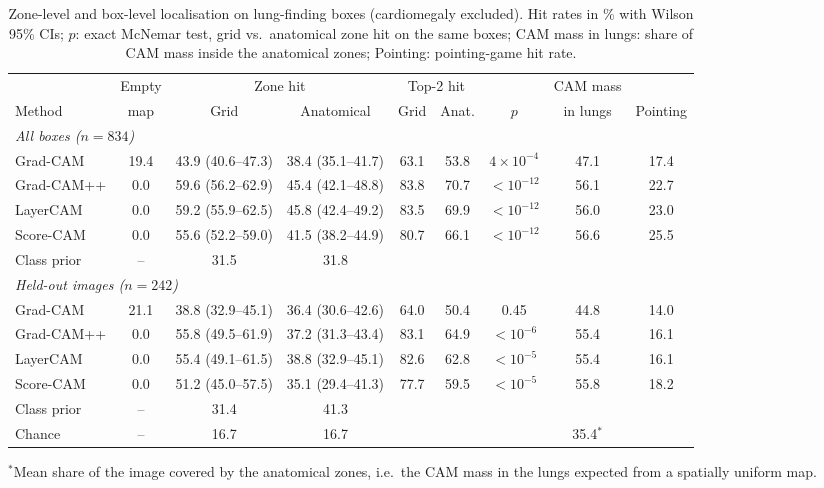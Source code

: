 \documentclass[pdflatex,sn-mathphys-num]{sn-jnl}
\begin{document}
\begin{table}[t]
\caption{Zone-level and box-level localisation on lung-finding boxes (cardiomegaly excluded). Hit rates in \% with Wilson 95\% CIs; $p$: exact McNemar test, grid vs.\ anatomical zone hit on the same boxes; CAM mass in lungs: share of CAM mass inside the anatomical zones; Pointing: pointing-game hit rate.}\label{tab:zone}
\centering
\small
\setlength{\tabcolsep}{3pt}
\begin{tabular}{lcccccccc}
\toprule
 & Empty & \multicolumn{2}{c}{Zone hit} & \multicolumn{2}{c}{Top-2 hit} & & CAM mass & \\
Method & map & Grid & Anatomical & Grid & Anat. & $p$ & in lungs & Pointing \\
\midrule
\multicolumn{9}{l}{\emph{All boxes ($n=834$)}}\\
Grad-CAM   & 19.4 & 43.9 (40.6--47.3) & 38.4 (35.1--41.7) & 63.1 & 53.8 & $4\times10^{-4}$ & 47.1 & 17.4 \\
Grad-CAM++ & 0.0 & 59.6 (56.2--62.9) & 45.4 (42.1--48.8) & 83.8 & 70.7 & $<10^{-12}$ & 56.1 & 22.7 \\
LayerCAM   & 0.0 & 59.2 (55.9--62.5) & 45.8 (42.4--49.2) & 83.5 & 69.9 & $<10^{-12}$ & 56.0 & 23.0 \\
Score-CAM  & 0.0 & 55.6 (52.2--59.0) & 41.5 (38.2--44.9) & 80.7 & 66.1 & $<10^{-12}$ & 56.6 & 25.5 \\
Class prior & -- & 31.5 & 31.8 & & & & & \\
\midrule
\multicolumn{9}{l}{\emph{Held-out images ($n=242$)}}\\
Grad-CAM   & 21.1 & 38.8 (32.9--45.1) & 36.4 (30.6--42.6) & 64.0 & 50.4 & 0.45 & 44.8 & 14.0 \\
Grad-CAM++ & 0.0 & 55.8 (49.5--61.9) & 37.2 (31.3--43.4) & 83.1 & 64.9 & $<10^{-6}$ & 55.4 & 16.1 \\
LayerCAM   & 0.0 & 55.4 (49.1--61.5) & 38.8 (32.9--45.1) & 82.6 & 62.8 & $<10^{-5}$ & 55.4 & 16.1 \\
Score-CAM  & 0.0 & 51.2 (45.0--57.5) & 35.1 (29.4--41.3) & 77.7 & 59.5 & $<10^{-5}$ & 55.8 & 18.2 \\
Class prior & -- & 31.4 & 41.3 & & & & & \\
\midrule
Chance & -- & 16.7 & 16.7 & & & & 35.4$^\ast$ & \\
\bottomrule
\end{tabular}

\footnotesize{$^\ast$Mean share of the image covered by the anatomical zones, i.e.\ the CAM mass in the lungs expected from a spatially uniform map.}
\end{table}
\end{document}
